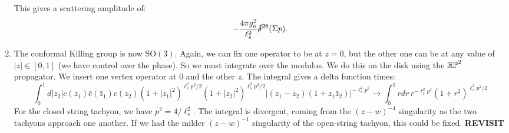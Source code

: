 \documentclass[11pt, class=article, crop=false]{standalone}
\begin{document}
\begin{enumerate}
	This gives a scattering amplitude of:
	\[
		-\frac{4 \pi g_o^2}{\ell_s^2}  \cancel\delta^{26}(\Sigma p).
	\]

	\item The conformal Killing group is now $\mathrm{SO}(3)$. Again, we can fix one operator to be at $z = 0$, but the other one can be at any value of $|z| \in [0, 1]$ (we have control over the phase). So we must integrate over the modulus. We do this on the disk using the $\mathbb{RP}^2$ propagator. We insert one vertex operator at $0$ and the other $z$. The integral gives a delta function times: 
	\[
		\int_0^1 d|z_2| c(z_1)\bar c(\bar z_1) c(z_2)  (1+|z_1|^2)^{\ell_s^2 p^2/2} (1+|z_2|^2)^{\ell_s^2 p^2/2} |(z_1 - z_2) (1+z_1 \bar z_2)|^{-\ell_s^2 p^2}\to \int_0^1 r dr\, r^{-\ell_s^2 p^2} (1+r^2)^{\ell_s^2 p^2/2}
	\]
	For the closed string tachyon, we have $p^2 = 4/\ell_s^2$. The integral is divergent, coming from the $(z-w)^{-4}$ singularity as the two tachyons approach one another. If we had the milder $(z-w)^{-1}$ singularity of the open-string tachyon, this could be fixed. 
	\textbf{REVISIT}
	

\end{enumerate}
\end{document}
